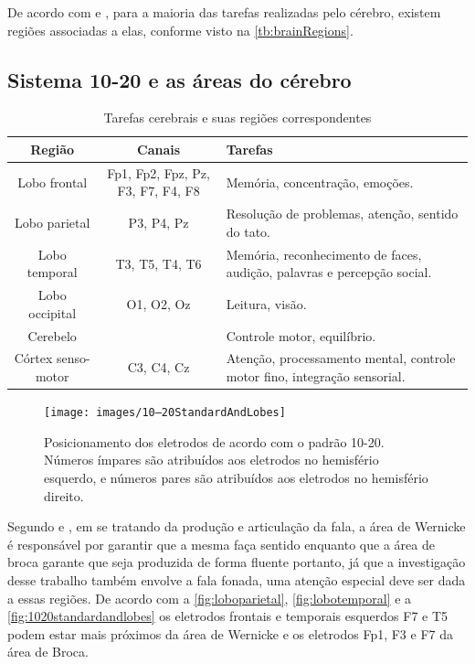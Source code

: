 			\par De acordo com \cite{JALALYBIDGOLY2020101788} e \cite{sistema10-20}, para a maioria das tarefas realizadas pelo cérebro, existem regiões associadas a elas, conforme visto na \autoref{tb:brainRegions}.
			
			\subsection{Sistema 10-20 e as áreas do cérebro}
			\begin{table}[H]
				\begin{center}
					\caption{Tarefas cerebrais e suas regiões correspondentes}
					\begin{tabular}{|c|c|p{}|}
						\hline
						Região & Canais & Tarefas\\
						\hline
						Lobo frontal & Fp1, Fp2, Fpz, Pz, F3, F7, F4, F8 & Memória, concentração, emoções.\\
						\hline
						Lobo parietal & P3, P4, Pz & Resolução de problemas, atenção, sentido do tato. \\
						\hline
						Lobo temporal & T3, T5, T4, T6 & Memória, reconhecimento de faces, audição, palavras e percepção social. \\
						\hline
						Lobo occipital & O1, O2, Oz & Leitura, visão.\\
						\hline
						Cerebelo && Controle motor, equilíbrio. \\
						\hline
						Córtex senso-motor & C3, C4, Cz& Atenção, processamento mental, controle motor fino, integração sensorial. \\
						\hline
					\end{tabular}
					\label{tb:brainRegions}
				\end{center}
			\end{table}
			
			\begin{figure}[H]
				\centering
				\caption[Sistema 10-20 e lobos cerebrais]{Posicionamento dos eletrodos de acordo com o padrão 10-20. Números ímpares são atribuídos aos eletrodos no hemisfério esquerdo, e números pares são atribuídos aos eletrodos no hemisfério direito.}
				\texttt{[image: images/10–20StandardAndLobes]}
				\label{fig:1020standardandlobes}
			\end{figure}
		
			\par Segundo \cite{bioengineering10060649} e \cite{pinto2012manual}, em se tratando da produção e articulação da fala, a área de Wernicke é responsável por garantir que a mesma faça sentido enquanto que a área de broca garante que seja produzida de forma fluente portanto, já que a investigação desse trabalho também envolve a fala fonada, uma atenção especial deve ser dada a essas regiões. De acordo com a \autoref{fig:loboparietal}, \autoref{fig:lobotemporal} e a \autoref{fig:1020standardandlobes} os eletrodos frontais e temporais esquerdos F7 e T5 podem estar mais próximos da área de Wernicke e os eletrodos Fp1, F3 e F7 da área de Broca.
			
